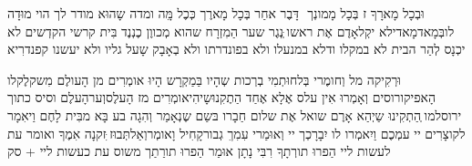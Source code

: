 \documentclass[14pt, a5paper, twoside, extrafontsizes]{memoir}
\begin{document}
\begin{hebrew}
וּבְכָל מָארָךָ ז בְּכָל מָמונְך ‏ דָּבֶר אחַר בְּכָל
מָארֶך כְּכֶל מִָּה ומדה שָהוּא מודר לך הוי
מוּדָה לובְּמָאדמָאדילא יקְלאָדֶם אֶת ראשו
ְּנְגֶר שער הַמִזְרָח שהוא מְכווֶן כֶנְנֶד בִּית
קרשי הקדְשים \hdot
 לא יכְנָס לְהַר הבית לא
במקלו ודלא במנעלו ולא בפונדרתו ולא
בְאָבָק שָעל גליו \hdot
 ולא יעשנו קפנדרִיא \hdot

וּרְקִיקה מל וְחומֶרי בְּלחוּתְמִי בְרְכות שְהָיו
בַּמַקְרָש הָיוּ אומְרִים מן הָעולֶם \hdot
 מִשקלֶקלו
הָאפיקורוסים וְאָמְרוּ אִין עלס אֶלָא אֶחַד \hdot
הַתֶקִנוּשָיהִיאומְרִים מז הָעלֶסוְערהָעלֶם וסיס כתוך ירוסלמו \hdot
ְהַתְקִינוּ שַיְהַא אָרֶם שואל אֶת שלום חַבָרו
בּשַם \hdot
 שֶנְאָמַר וְהִגָה בע בָּא מבִּית לָחֶם
וַיאִמָר לקוצָרִים יי עמְכֶם וַיִאמְרו לו יִבָרָכְך
יי וְאוּמַרי עִמִךִ גְבורקָחִיל\hdot
וָאומְרוְאַלתְּבוּז
ִּזקנָה אִמֶךָ \hdot
 ואומר עת לעשות ליי הַפרוּ
תורְתָךָ \hdot
 רִבִּי נָתָן אוּמַר הַפרוּ תורַתַך משוס
עת כעשות ליי + סק
\end{hebrew}
\end{document}
